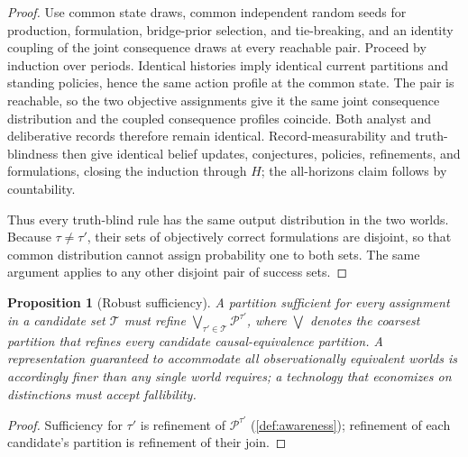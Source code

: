 \documentclass[11pt]{article}
\newtheorem{proposition}[assumption]{Proposition}
\theoremstyle{definition}
\begin{document}
\begin{proof}
Use common state draws, common independent random seeds for production, formulation, bridge-prior selection, and tie-breaking, and an identity coupling of the joint consequence draws at every reachable pair.
Proceed by induction over periods.
Identical histories imply identical current partitions and standing policies, hence the same action profile at the common state.
The pair is reachable, so the two objective assignments give it the same joint consequence distribution and the coupled consequence profiles coincide.
Both analyst and deliberative records therefore remain identical.
Record-measurability and truth-blindness then give identical belief updates, conjectures, policies, refinements, and formulations, closing the induction through $H$; the all-horizons claim follows by countability.

Thus every truth-blind rule has the same output distribution in the two worlds.
Because $\tau\neq\tau'$, their sets of objectively correct formulations are disjoint, so that common distribution cannot assign probability one to both sets.
The same argument applies to any other disjoint pair of success sets.
\end{proof}

\begin{proposition}[Robust sufficiency]
\label{prop:robust-sufficiency}
A partition sufficient for every assignment in a candidate set $\mathcal T$ must refine $\bigvee_{\tau'\in\mathcal T}\mathcal P^{\tau'}$, where $\bigvee$ denotes the coarsest partition that refines every candidate causal-equivalence partition.
A representation guaranteed to accommodate all observationally equivalent worlds is accordingly finer than any single world requires; a technology that economizes on distinctions must accept fallibility.
\end{proposition}

\begin{proof}
Sufficiency for $\tau'$ is refinement of $\mathcal P^{\tau'}$ (\cref{def:awareness}); refinement of each candidate's partition is refinement of their join.
\end{proof}
\end{document}
